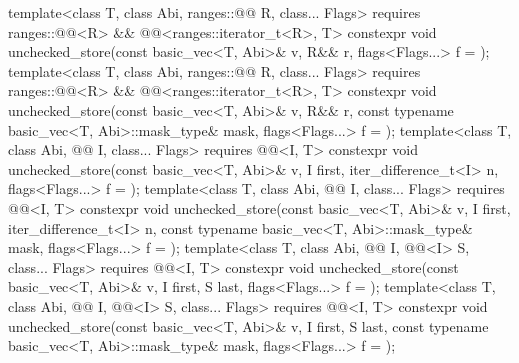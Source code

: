 \begin{itemdecl}
template<class T, class Abi, ranges::@@ R, class... Flags>
  requires ranges::@@<R> && @@<ranges::iterator_t<R>, T>
  constexpr void unchecked_store(const basic_vec<T, Abi>& v, R&& r, flags<Flags...> f = {});
template<class T, class Abi, ranges::@@ R, class... Flags>
  requires ranges::@@<R> && @@<ranges::iterator_t<R>, T>
  constexpr void unchecked_store(const basic_vec<T, Abi>& v, R&& r,
    const typename basic_vec<T, Abi>::mask_type& mask, flags<Flags...> f = {});
template<class T, class Abi, @@ I, class... Flags>
  requires @@<I, T>
  constexpr void unchecked_store(const basic_vec<T, Abi>& v, I first, iter_difference_t<I> n,
                                 flags<Flags...> f = {});
template<class T, class Abi, @@ I, class... Flags>
  requires @@<I, T>
  constexpr void unchecked_store(const basic_vec<T, Abi>& v, I first, iter_difference_t<I> n,
    const typename basic_vec<T, Abi>::mask_type& mask, flags<Flags...> f = {});
template<class T, class Abi, @@ I, @@<I> S, class... Flags>
  requires @@<I, T>
  constexpr void unchecked_store(const basic_vec<T, Abi>& v, I first, S last,
                                 flags<Flags...> f = {});
template<class T, class Abi, @@ I, @@<I> S, class... Flags>
  requires @@<I, T>
  constexpr void unchecked_store(const basic_vec<T, Abi>& v, I first, S last,
    const typename basic_vec<T, Abi>::mask_type& mask, flags<Flags...> f = {});
\end{itemdecl}

